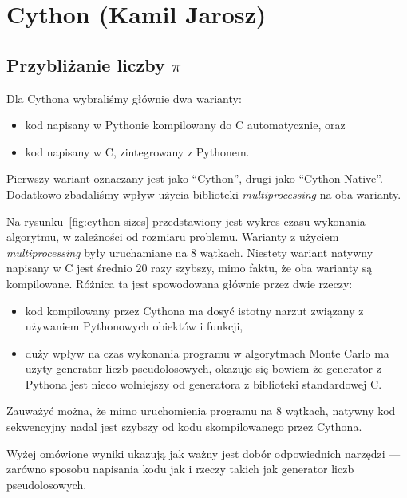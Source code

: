 \section{Cython (Kamil Jarosz)}

\subsection{Przybliżanie liczby $\pi$}

\begin{figure*}
    \centering
    
    \caption{Czas wykonania algorytmu w Cythonie w zależności od rozmiaru problemu}
    \label{fig:cython-sizes}
\end{figure*}

Dla Cythona wybraliśmy głównie dwa warianty:
\begin{itemize}
    \item kod napisany w Pythonie kompilowany do C automatycznie, oraz
    \item kod napisany w C, zintegrowany z Pythonem.
\end{itemize}
Pierwszy wariant oznaczany jest jako ``Cython'', drugi jako ``Cython Native''.
Dodatkowo zbadaliśmy wpływ użycia biblioteki \textit{multiprocessing}
na oba warianty.

Na rysunku~\ref{fig:cython-sizes} przedstawiony jest wykres czasu wykonania
algorytmu, w zależności od rozmiaru problemu.
Warianty z użyciem \textit{multiprocessing} były uruchamiane na
8 wątkach.
Niestety wariant natywny napisany w C jest średnio 20 razy szybszy,
mimo faktu, że oba warianty są kompilowane.
Różnica ta jest spowodowana głównie przez dwie rzeczy:
\begin{itemize}
    \item kod kompilowany przez Cythona ma dosyć istotny narzut związany z
    używaniem Pythonowych obiektów i funkcji,
    \item duży wpływ na czas wykonania programu w algorytmach Monte Carlo
    ma użyty generator liczb pseudolosowych, okazuje się
    bowiem że generator z Pythona jest nieco wolniejszy od
    generatora z biblioteki standardowej C\@.
\end{itemize}
Zauważyć można, że mimo uruchomienia programu na 8 wątkach,
natywny kod sekwencyjny nadal jest szybszy od kodu skompilowanego przez
Cythona.

Wyżej omówione wyniki ukazują jak ważny jest dobór odpowiednich narzędzi
--- zarówno sposobu napisania kodu jak i rzeczy takich jak generator
liczb pseudolosowych.

